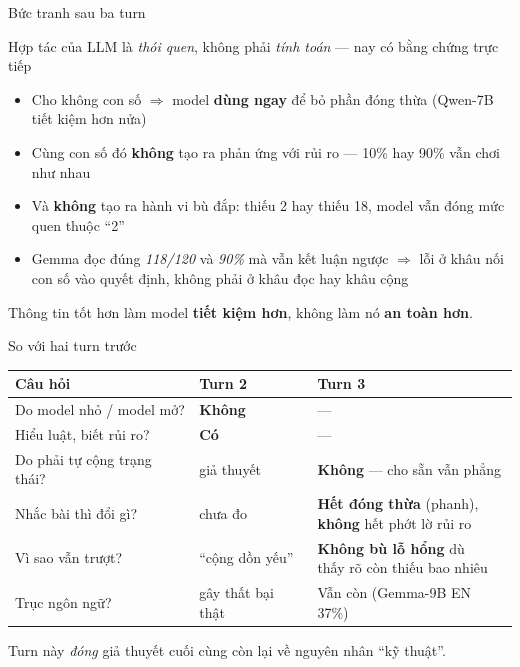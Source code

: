 \documentclass[aspectratio=169,10pt]{beamer}
\newcommand{\good}[1]{\textcolor{green!45!black}{\textbf{#1}}}
\newcommand{\weak}[1]{\textcolor{red!70!black}{\textbf{#1}}}
\newcommand{\take}[1]{\vfill{\footnotesize\textcolor{green!45!black}{#1}}}
\begin{document}
\begin{frame}{Bức tranh sau ba turn}
  \begin{block}{Hợp tác của LLM là \emph{thói quen}, không phải \emph{tính toán} --- nay có bằng chứng trực tiếp}
    \begin{itemize}\setlength\itemsep{3pt}
      \item Cho không con số $\Rightarrow$ model \good{dùng ngay} để bỏ phần đóng thừa (Qwen-7B tiết kiệm hơn nửa)
      \item Cùng con số đó \weak{không} tạo ra phản ứng với rủi ro --- 10\% hay 90\% vẫn chơi như nhau
      \item Và \weak{không} tạo ra hành vi bù đắp: thiếu 2 hay thiếu 18, model vẫn đóng mức quen thuộc ``2''
      \item Gemma đọc đúng \emph{118/120} và \emph{90\%} mà vẫn kết luận ngược $\Rightarrow$ lỗi ở khâu
            \alert{nối con số vào quyết định}, không phải ở khâu đọc hay khâu cộng
    \end{itemize}
  \end{block}
  \take{Thông tin tốt hơn làm model \good{tiết kiệm hơn}, không làm nó \weak{an toàn hơn}.}
\end{frame}

\begin{frame}{So với hai turn trước}
  \centering
  \setlength{\tabcolsep}{9pt}\renewcommand{\arraystretch}{1.3}
  \begin{tabular}{lll}
    \toprule
    Câu hỏi & Turn 2 & Turn 3 \\
    \midrule
    Do model nhỏ / model mở?     & \weak{Không} & --- \\
    Hiểu luật, biết rủi ro?      & \good{Có}    & --- \\
    Do phải tự cộng trạng thái?  & giả thuyết   & \weak{Không} --- cho sẵn vẫn phẳng \\
    \rowcolor{hirow} Nhắc bài thì đổi gì? & chưa đo & \makecell[l]{\good{Hết đóng thừa} (phanh),\\\weak{không} hết phớt lờ rủi ro} \\
    Vì sao vẫn trượt?            & ``cộng dồn yếu'' & \makecell[l]{\weak{Không bù lỗ hổng} dù\\thấy rõ còn thiếu bao nhiêu} \\
    Trục ngôn ngữ?               & gây thất bại thật & \alert{Vẫn còn} (Gemma-9B EN 37\%) \\
    \bottomrule
  \end{tabular}
  \take{Turn này \emph{đóng} giả thuyết cuối cùng còn lại về nguyên nhân ``kỹ thuật''.}
\end{frame}
\end{document}
